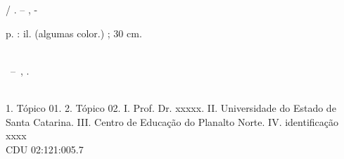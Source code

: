\imprimircapa


\imprimirfolhaderosto*


%     

\begin{fichacatalografica}
	\vspace*{\fill}					%
	\begin{center}					%
	\begin{minipage}[c]{12.5cm}		%
	
	\imprimirautor
	
	\hspace{0.5cm} \imprimirtitulo  / \imprimirautor. --
	\imprimirlocal, \imprimirdata-
	
	\hspace{0.5cm} \pageref{LastPage} p. : il. (algumas color.) ; 30 cm.\\
	
	\hspace{0.5cm} \imprimirorientadorRotulo~\imprimirorientador\\
	
	\hspace{0.5cm}
	\parbox[t]{\textwidth}{\imprimirtipotrabalho~--~\imprimirinstituicao,
	\imprimirdata.}\\
	
	\hspace{0.5cm}
		1. Tópico 01.
		2. Tópico 02.
		I. Prof. Dr. xxxxx.
		II. Universidade do Estado de Santa Catarina.
		III. Centro de Educação do Planalto Norte.
		IV. identificação xxxx\\ 			
	
	\hspace{8.75cm} CDU 02:121:005.7\\
	
	\end{minipage}
	\end{center}
\end{fichacatalografica}



